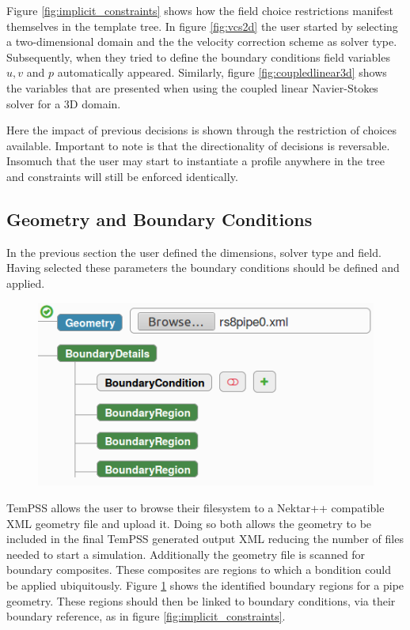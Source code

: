 \documentclass[11pt, a4paper]{report}
\begin{document}
Figure \ref{fig:implicit_constraints} shows how the field choice restrictions manifest themselves in the template tree. In figure \ref{fig:vcs2d} the user started by selecting a two-dimensional domain and the the velocity correction scheme as solver type. Subsequently, when they tried to define the boundary conditions field variables $u, v$ and $p$ automatically appeared. Similarly, figure \ref{fig:coupledlinear3d} shows the variables that are presented when using the coupled linear Navier-Stokes solver for a 3D domain.

Here the impact of previous decisions is shown through the restriction of choices available. Important to note is that the directionality of decisions is reversable. Insomuch that the user may start to instantiate a profile anywhere in the tree and constraints will still be enforced identically.

\subsection{Geometry and Boundary Conditions}
In the previous section the user defined the dimensions, solver type and field. Having selected these parameters the boundary conditions should be defined and applied.

\begin{figure}[htb!]
 \centering
 \includegraphics[width=.6\linewidth,  clip=true, trim = 0cm 0cm 0cm 0cm]{geometry_upload}
 \label{fig:geometry_upload}
\end{figure}

TemPSS allows the user to browse their filesystem to a Nektar++ compatible XML geometry file and upload it. Doing so both allows the geometry to be included in the final TemPSS generated output XML reducing the number of files needed to start a simulation. Additionally the geometry file is scanned for boundary composites. These composites are regions to which a bondition could be applied ubiquitously. Figure \ref{fig:geometry_upload} shows the identified boundary regions for a pipe geometry. These regions should then be linked to boundary conditions, via their boundary reference, as in figure \ref{fig:implicit_constraints}.
\end{document}

